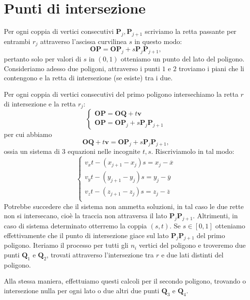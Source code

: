 \documentclass[a4paper]{article}
\newcommand{\B}{\mathbf}
\begin{document}
\section{Punti di intersezione}
Per ogni coppia di vertici consecutivi $\B{P}_j,\B{P}_{j+1}$ scriviamo la retta passante per entrambi $r_j$ attraverso l'ascissa curvilinea $s$ in questo modo: 
$$
\B{OP}=\B{OP}_j+s\B{P}_j\B{P}_{j+1},
$$
pertanto solo per valori di $s$ in $(0,1)$ otteniamo un punto del lato del poligono. 
Consideriamo adesso due poligoni, attraverso i punti $1$ e $2$ troviamo i piani che li contengono e la retta di intersezione (se esiste) tra i due.

Per ogni coppia di vertici consecutivi del primo poligono intersechiamo la retta $r$ di intersezione e la retta $r_j$:
$$
\begin{cases}
\B{OP}=\B{OQ}+t\B{v} \\ 
\B{OP}=\B{OP}_j+s\B{P}_j\B{P}_{j+1}
\end{cases}
$$
per cui abbiamo $$\B{OQ}+t\B{v}=\B{OP}_j+s\B{P}_j\B{P}_{j+1},$$ ossia un sistema di $3$ equazioni nelle incognite $t,s$. Riscriviamolo in tal modo:
\begin{equation} \label{sis:parametri}
\begin{cases}
v_xt-(x_{j+1}-x_j)s=x_j-\overline{x} \\
v_yt-(y_{j+1}-y_j)s=y_j-\overline{y} \\
v_zt-(z_{j+1}-z_j)s=z_j-\overline{z} \\
\end{cases}
\end{equation}
Potrebbe succedere che il sistema non ammetta soluzioni, in tal caso le due rette non si intersecano, cioè la traccia non attraversa il lato $\B{P}_j\B{P}_{j+1}$. Altrimenti, in caso di sistema determinato otterremo la coppia $(s,t)$. Se $s\in[0,1]$ otteniamo effettivamente che il punto di intersezione giace sul lato $\B{P}_j\B{P}_{j+1}$ del primo poligono. Iteriamo il processo per tutti gli $n_i$ vertici del poligono e troveremo due punti $\B{Q}_1$ e $\B{Q}_2$, trovati attraverso l'intersezione tra $r$ e due lati distinti del poligono.

Alla stessa maniera, effettuiamo questi calcoli per il secondo poligono, trovando o intersezione nulla per ogni lato o due altri due punti $\B{Q}_3$ e $\B{Q}_4$.
\end{document}
